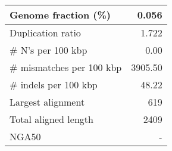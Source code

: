 \documentclass[12pt,a4paper]{article}
\begin{document}
\begin{table}[ht]
\begin{center}
\begin{tabular}{|l*{1}{|r}|}
Genome fraction (\%) & 0.056 \\ \hline
Duplication ratio & 1.722 \\ \hline
\# N's per 100 kbp & 0.00 \\ \hline
\# mismatches per 100 kbp & 3905.50 \\ \hline
\# indels per 100 kbp & 48.22 \\ \hline
Largest alignment & 619 \\ \hline
Total aligned length & 2409 \\ \hline
NGA50 & - \\ \hline
\end{tabular}
\end{center}
\end{table}
\end{document}
